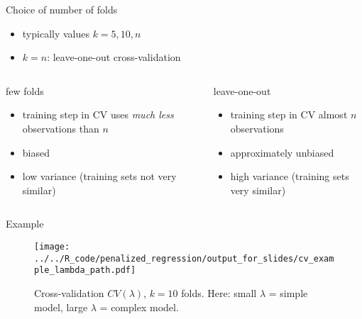\documentclass[xcolor=dvipsnames, handout]{beamer}
\begin{document}
\begin{frame}{Choice of number of folds}
\begin{itemize}
  \item typically values $k = 5, 10, n$
  \item $k = n$: leave-one-out cross-validation
\end{itemize}
\begin{columns}[t, onlytextwidth]
        \begin{block}{few folds}
        \begin{itemize}
          \item<1-> 
          training step in CV uses \emph{much less} observations than $n$
          \item<2-> 
          biased
          \item<3-> 
          low variance (training sets not very similar)
        \end{itemize}
        \end{block}
        \begin{block}{leave-one-out}
        \begin{itemize}
          \item<1-> 
          training step in CV almost $n$ observations
          \item<2-> 
          approximately unbiased
          \item<3-> 
          high variance (training sets very similar)        
        \end{itemize}
      \end{block}
\end{columns}
\end{frame}

\begin{frame}{Example}
  \begin{figure}
  \texttt{[image: ../../R\_code/penalized\_regression/output\_for\_slides/cv\_example\_lambda\_path.pdf]}
   \caption{Cross-validation $CV(\lambda)$, $k = 10$ folds. Here: small $\lambda$ = simple model, large $\lambda$ = complex model.}
\end{figure}
\end{frame}
\end{document}
